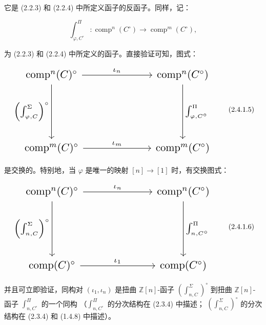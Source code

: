 \clearpage
{}%
它是 (2.2.3) 和 (2.2.4) 中所定义函子的反函子。同样，记：

\begin{equation}
  \int_{\varphi,C^\circ}^{\Pi}\colon
  \operatorname{comp}^{n}(C^\circ)
  \longrightarrow
  \operatorname{comp}^{m}(C^\circ),
  \tag{2.4.1.4}
\end{equation}

为 (2.2.3) 和 (2.2.4) 中所定义的函子。直接验证可知，图式：

\begin{equation}
  \resizebox{0.82\textwidth}{!}{%
    $\begin{tikzcd}[ampersand replacement=\&,column sep=6.5em,row sep=5.2em]
      \operatorname{comp}^{n}(C)^\circ
        \arrow[r,"\iota_n"]
        \arrow[d,"{\left(\int_{\varphi,C}^{\Sigma}\right)^\circ}"']
        \& \operatorname{comp}^{n}(C^\circ)
          \arrow[d,"{\int_{\varphi,C^\circ}^{\Pi}}"] \\
      \operatorname{comp}^{m}(C)^\circ
        \arrow[r,"\iota_m"]
        \& \operatorname{comp}^{m}(C^\circ)
    \end{tikzcd}$%
  }
  \tag{2.4.1.5}
\end{equation}

是交换的。特别地，当 $\varphi$ 是唯一的映射
$[n]\longrightarrow[1]$ 时，有交换图式：

\begin{equation}
  \resizebox{0.82\textwidth}{!}{%
    $\begin{tikzcd}[ampersand replacement=\&,column sep=6.5em,row sep=5.2em]
      \operatorname{comp}^{n}(C)^\circ
        \arrow[r,"\iota_n"]
        \arrow[d,"{\left(\int_{n,C}^{\Sigma}\right)^\circ}"']
        \& \operatorname{comp}^{n}(C^\circ)
          \arrow[d,"{\int_{n,C^\circ}^{\Pi}}"] \\
      \operatorname{comp}(C)^\circ
        \arrow[r,"\iota_1"]
        \& \operatorname{comp}(C^\circ)
    \end{tikzcd}$%
  }
  \tag{2.4.1.6}
\end{equation}

并且可立即验证，同构对 $(\iota_1,\iota_n)$ 是扭曲
$\mathbb Z[n]$-函子 $\left(\int_{n,C}^{\Sigma}\right)^\circ$ 到扭曲
$\mathbb Z[n]$-函子 $\int_{n,C^\circ}^{\Pi}$ 的一个同构
（$\int_{n,C^\circ}^{\Pi}$ 的分次结构在 (2.3.4) 中描述；
$\left(\int_{n,C}^{\Sigma}\right)^\circ$ 的分次结构在 (2.3.4) 和
(1.4.8) 中描述）。

